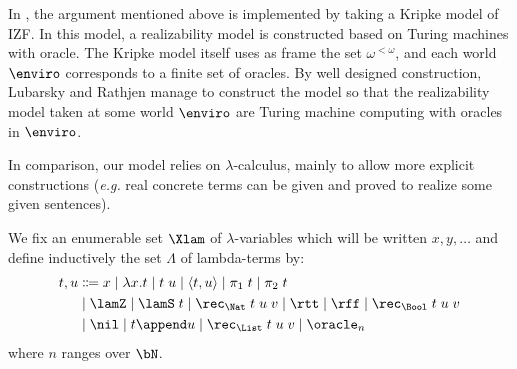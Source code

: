 



In \cite{LubRat13}, the argument mentioned above is implemented by taking a Kripke model of IZF. In this model, a realizability model is constructed based on Turing machines with oracle. The Kripke model itself uses as frame the set $\omega^{<\omega}$, and each world $\enviro$ corresponds to a finite set of oracles. By well designed construction, Lubarsky and Rathjen manage to construct the model so that the realizability model taken at some world $\enviro$ are Turing machine computing with oracles in $\enviro$.

In comparison, our model relies on $\lambda$-calculus, mainly to allow more explicit constructions (\textit{e.g.} real concrete terms can be given and proved to realize some given sentences).




\begin{definition}
  We fix an enumerable set $\Xlam$ of $\lambda$-variables which will be written
  $x,y,\ldots$ and define inductively the set $\Lambda$ of lambda-terms by:
  \begin{align*}
    t,u  &\Coloneq  x \mid \lambda x.t \mid t\;u
     \mid \langle t,u\rangle \mid \pi_1\;t \mid \pi_2\;t \\
    & \mid \lamZ \mid \lamS\;t \mid \rec_{\Nat}\;t\;u\;v
     \mid \rtt \mid \rff \mid \rec_{\Bool}\;t\;u\;v\\
    & \mid \nil \mid t\append u \mid \rec_{\List}\;t\;u\;v
     \mid \oracle_n
  \end{align*}
  where $n$ ranges over $\bN$.
\end{definition}

